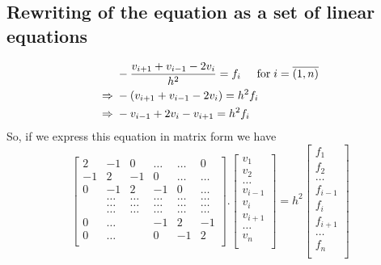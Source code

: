 \documentclass[a4paper, twoside, 11pt]{report}
\theoremstyle{theorem}
\theoremstyle{remark}
\theoremstyle{exemple}
\begin{document}
		\subsection{Rewriting of the equation as a set of linear equations}
		\begin{align}
		&-\frac{v_{i+1} + v_{i-1} - 2v_{i}}{h^2} = f_{i} \hspace{0.5cm} \mathrm{for} \hspace{0.1cm} i = \overline {(1,n)}
		\\ \Rightarrow \hspace{0,1cm} &-(v_{i+1} + v_{i-1} - 2v_{i}) = h^2 f_{i}
		\\ \Rightarrow \hspace{0,1cm} &- v_{i-1} + 2v_{i} - v_{i+1} = h^2 f_{i}
		\end{align}
		So, if we express this equation in matrix form we have
		\begin{equation*}
		\begin{bmatrix}
                           2& -1& 0 &\dots   & \dots &0 \\
                           -1 & 2 & -1 &0 &\dots &\dots \\
                           0&-1 &2 & -1 & 0 & \dots \\
                           & \dots   & \dots &\dots   &\dots & \dots \\
													 & \dots   & \dots &\dots   &\dots & \dots \\
													 & \dots   & \dots &\dots   &\dots & \dots \\
                           0&\dots   &  &-1 &2& -1 \\
                           0&\dots    &  & 0  &-1 & 2 \\
                      \end{bmatrix} . \begin{bmatrix}
                           v_1\\
                           v_2\\
                           \dots \\
                          v_{i-1}  \\
													v_i \\
													v_{i+1} \\
                          \dots \\
                           v_n\\
                      \end{bmatrix}
											= h^2 \begin{bmatrix}
                           f_1\\
                           f_2\\
                           \dots \\
                           f_{i-1} \\
													f_i \\
													f_{i+1} \\
                          \dots \\
                           f_n\\
                      \end{bmatrix}
		\end{equation*} 									
\end{document}
